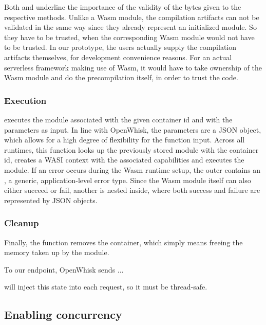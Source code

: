 Both  and  underline the importance of the validity of the bytes given to the respective  methods. Unlike a Wasm module, the compilation artifacts can not be validated in the same way since they already represent an initialized module. So they have to be trusted, when the corresponding Wasm module would not have to be trusted. In our prototype, the users actually supply the compilation artifacts themselves, for development convenience reasons. For an actual serverless framework making use of Wasm, it would have to take ownership of the Wasm module and do the precompilation itself, in order to trust the code.

\subsubsection{Execution}
 executes the module associated with the given container id and with the parameters as input. In line with OpenWhisk, the parameters are a JSON object, which allows for a high degree of flexibility for the function input. Across all runtimes, this function looks up the previously stored module with the container id, creates a WASI context with the associated capabilities and executes the module. If an error occurs during the Wasm runtime setup, the outer  contains an , a generic, application-level error type. Since the Wasm module itself can also either succeed or fail, another  is nested inside, where both success and failure are represented by JSON objects.

\subsubsection{Cleanup}
Finally, the  function removes the container, which simply means freeing the memory taken up by the module.


To our  endpoint, OpenWhisk sends ...



 will inject this state into each request, so it must be thread-safe.


\subsection{Enabling concurrency}

